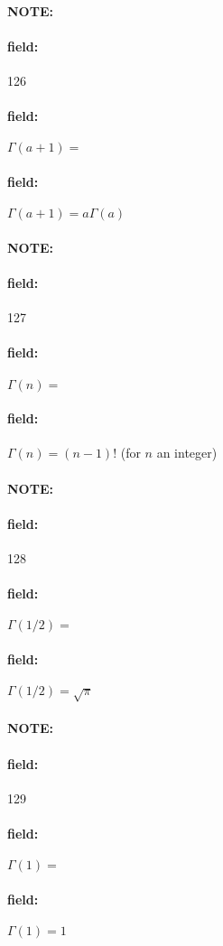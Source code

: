 \documentclass[12pt]{article}
\newenvironment{note}{\paragraph{NOTE:}}{}
\newenvironment{field}{\paragraph{field:}}{}
\begin{document}
\begin{note} \begin{field} \tiny 126 \end{field}
  \begin{field}
    $\Gamma(a + 1) = $
  \end{field}
  \begin{field}
    $\Gamma(a + 1) = a\Gamma(a)$
  \end{field}
\end{note}

\begin{note} \begin{field} \tiny 127 \end{field}
  \begin{field}
    $\Gamma(n) = $
  \end{field}
  \begin{field}
    $\Gamma(n) = (n-1)!$ (for $n$ an integer)
  \end{field}
\end{note}

\begin{note} \begin{field} \tiny 128 \end{field}
  \begin{field}
    $\Gamma(1/2) = $
  \end{field}
  \begin{field}
    $\Gamma(1/2) = \sqrt{\pi}$
  \end{field}
\end{note}

\begin{note} \begin{field} \tiny 129 \end{field}
  \begin{field}
    $\Gamma(1) = $
  \end{field}
  \begin{field}
    $\Gamma(1) = 1$
  \end{field}
\end{note}
\end{document}
